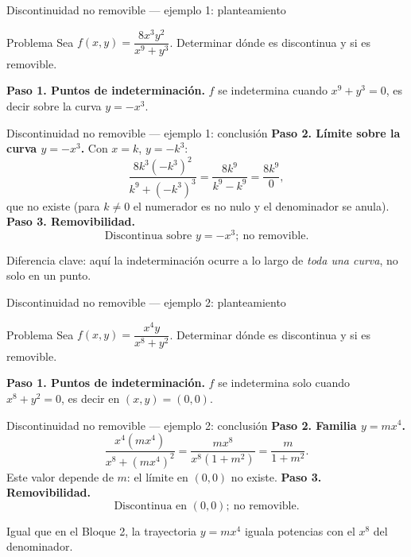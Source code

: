 \documentclass[11pt,aspectratio=169]{beamer}
\begin{document}
\begin{frame}{Discontinuidad no removible --- ejemplo 1: planteamiento}
  \begin{block}{Problema}
    Sea $f(x,y)=\dfrac{8x^3y^2}{x^9+y^3}$. Determinar dónde es discontinua y si es removible.
  \end{block}
  \pause
  \textbf{Paso 1. Puntos de indeterminación.} $f$ se indetermina cuando $x^9+y^3=0$, es decir sobre la curva $y=-x^3$.
\end{frame}

\begin{frame}{Discontinuidad no removible --- ejemplo 1: conclusión}
  \textbf{Paso 2. Límite sobre la curva $y=-x^3$.} Con $x=k$, $y=-k^3$:
  \[
    \frac{8k^3(-k^3)^2}{k^9+(-k^3)^3}=\frac{8k^9}{k^9-k^9}=\frac{8k^9}{0},
  \]
  \pause
  que no existe (para $k\neq 0$ el numerador es no nulo y el denominador se anula).
  \pause
  \textbf{Paso 3. Removibilidad.}
  \[
    \boxed{\text{Discontinua sobre }y=-x^3;\ \text{no removible.}}
  \]
  \pause
  \begin{center}\small\color{gray60} Diferencia clave: aquí la indeterminación ocurre a lo largo de \emph{toda una curva}, no solo en un punto.\end{center}
\end{frame}

\begin{frame}{Discontinuidad no removible --- ejemplo 2: planteamiento}
  \begin{block}{Problema}
    Sea $f(x,y)=\dfrac{x^4y}{x^8+y^2}$. Determinar dónde es discontinua y si es removible.
  \end{block}
  \pause
  \textbf{Paso 1. Puntos de indeterminación.} $f$ se indetermina solo cuando $x^8+y^2=0$, es decir en $(x,y)=(0,0)$.
\end{frame}

\begin{frame}{Discontinuidad no removible --- ejemplo 2: conclusión}
  \textbf{Paso 2. Familia $y=mx^4$.}
  \[
    \frac{x^4(mx^4)}{x^8+(mx^4)^2}=\frac{mx^8}{x^8(1+m^2)}=\frac{m}{1+m^2}.
  \]
  \pause
  Este valor depende de $m$: el límite en $(0,0)$ no existe.
  \pause
  \textbf{Paso 3. Removibilidad.}
  \[
    \boxed{\text{Discontinua en }(0,0);\ \text{no removible.}}
  \]
  \pause
  \begin{center}\small\color{gray60} Igual que en el Bloque 2, la trayectoria $y=mx^4$ iguala potencias con el $x^8$ del denominador.\end{center}
\end{frame}
\end{document}
